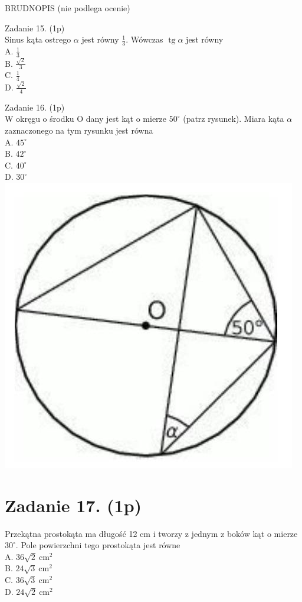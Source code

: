 \documentclass[10pt]{article}
\begin{document}
BRUDNOPIS (nie podlega ocenie)

Zadanie 15. (1p)\\
Sinus kąta ostrego \(\alpha\) jest równy \(\frac{1}{3}\). Wówczas \(\operatorname{tg} \alpha\) jest równy\\
A. \(\frac{1}{3}\)\\
B. \(\frac{\sqrt{2}}{3}\)\\
C. \(\frac{1}{4}\)\\
D. \(\frac{\sqrt{2}}{4}\)

Zadanie 16. (1p)\\
W okręgu o środku O dany jest kąt o mierze \(50^{\circ}\) (patrz rysunek). Miara kąta \(\alpha\) zaznaczonego na tym rysunku jest równa\\
A. \(45^{\circ}\)\\
B. \(42^{\circ}\)\\
C. \(40^{\circ}\)\\
D. \(30^{\circ}\)\\
\includegraphics[max width=\textwidth, center]{2024_11_21_fb7e622176e162773107g-06}

\section*{Zadanie 17. (1p)}
Przekątna prostokąta ma długość 12 cm i tworzy z jednym z boków kąt o mierze \(30^{\circ}\). Pole powierzchni tego prostokąta jest równe\\
A. \(36 \sqrt{2} \mathrm{~cm}^{2}\)\\
B. \(24 \sqrt{3} \mathrm{~cm}^{2}\)\\
C. \(36 \sqrt{3} \mathrm{~cm}^{2}\)\\
D. \(24 \sqrt{2} \mathrm{~cm}^{2}\)
\end{document}
